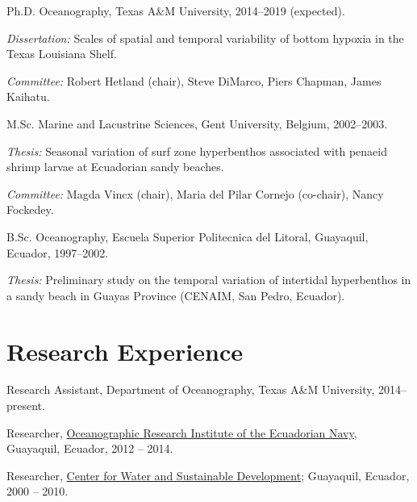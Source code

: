 \documentclass[10pt,letterpaper]{article}
\renewenvironment{itemize}{
  \begin{list}{}{
    \setlength{\leftmargin}{1.5em}
    \setlength{\itemsep}{0.25em}
    \setlength{\parskip}{0pt}
    \setlength{\parsep}{0.25em}
  }
}{
  \end{list}
}
\begin{document}
\begin{itemize}
  \item Ph.D. Oceanography, Texas A\&M University, 2014--2019 (expected).
  \begin{itemize}
      \item \textit{Dissertation:} Scales of spatial and temporal variability of bottom hypoxia in the Texas Louisiana Shelf.
             \item \textit{Committee:} Robert Hetland (chair), Steve DiMarco, Piers Chapman, James Kaihatu.
  \end{itemize}

  \item M.Sc. Marine and Lacustrine Sciences, Gent University, Belgium, 2002--2003.
  \begin{itemize}
       \item \textit{Thesis:} Seasonal variation of surf zone hyperbenthos associated with penaeid shrimp larvae at Ecuadorian sandy beaches.
       \item \textit{Committee:} Magda Vincx (chair), Maria del Pilar Cornejo (co-chair), Nancy Fockedey.
  \end{itemize}

  \item B.Sc. Oceanography, Escuela Superior Politecnica del Litoral, Guayaquil, Ecuador, 1997--2002.
  \begin{itemize}
      \item \textit{Thesis:} Preliminary study on the temporal variation of intertidal hyperbenthos in a sandy beach in Guayas Province (CENAIM, San Pedro, Ecuador).
  \end{itemize}

\end{itemize}

\section*{Research Experience}

\begin{itemize}
\item Research Assistant, Department of Oceanography, Texas A\&M University, 2014--present.
\item Researcher, \href{http://www.inocar.mil.ec/}{Oceanographic Research Institute of the Ecuadorian Navy}, Guayaquil, Ecuador, 2012 -- 2014.
\item Researcher, \href{http://www.cads.espol.edu.ec/}{Center for Water and Sustainable Development}; Guayaquil, Ecuador, 2000 -- 2010.
\end{itemize}
\end{document}
